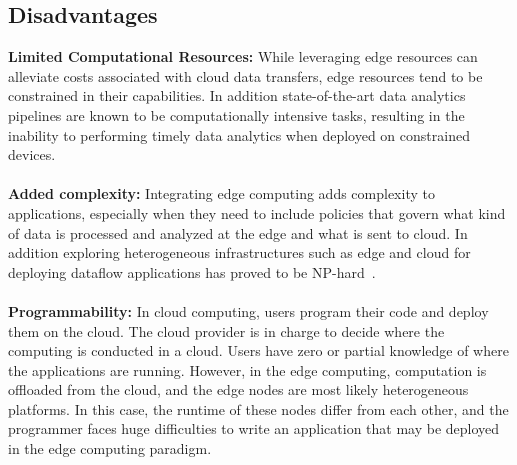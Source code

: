\subsection{Disadvantages}
\textbf{Limited Computational Resources:} While leveraging edge resources can alleviate costs associated with cloud data transfers, edge resources tend to be constrained in their capabilities. In addition state-of-the-art data analytics pipelines are known to be computationally intensive tasks, resulting in the inability to performing timely data analytics when deployed on constrained devices.
\\\\
\textbf{Added complexity:} Integrating edge computing adds complexity to applications, especially when they need to include policies that govern what kind of data is processed and analyzed at the edge and what is sent to cloud. In addition exploring heterogeneous infrastructures such as edge and cloud for deploying dataflow applications has proved to be NP-hard~\cite{Benoit:2013}.
\\\\
\textbf{Programmability:} In cloud computing, users program their code and deploy them on the cloud. The cloud provider is in charge to decide where the computing is conducted in a cloud. Users have zero or partial knowledge of where the applications are running. However, in the edge computing, computation is offloaded from the cloud, and the edge nodes are most likely heterogeneous platforms. In this case, the runtime of these nodes differ from each other, and the programmer faces huge difficulties to write an application that may be deployed in the edge computing paradigm.

